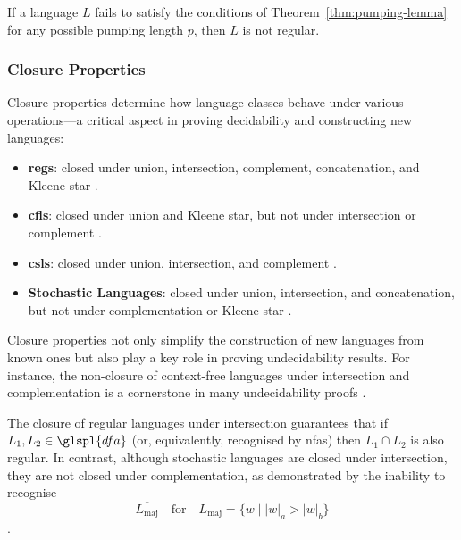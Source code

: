 \begin{corollary}
If a language $L$ fails to satisfy the conditions of Theorem~\ref{thm:pumping-lemma} for any possible pumping length $p$, then $L$ is not regular.
\end{corollary}

\subsubsection{Closure Properties}
Closure properties determine how language classes behave under various operations—a critical aspect in proving decidability and constructing new languages:

\begin{itemize}
    \item \textbf{\glspl{reg}}: closed under union, intersection, complement, concatenation, and Kleene star \cite{sipser2013introduction}.
    \item \textbf{\glspl{cfl}}: closed under union and Kleene star, but not under intersection or complement \cite{chomsky1956three, sipser2013introduction}.
    \item \textbf{\glspl{csl}}: closed under union, intersection, and complement \cite{chomsky1956three, sipser2013introduction}.
    \item \textbf{Stochastic Languages}: closed under union, intersection, and concatenation, but not under complementation or Kleene star \cite{rabin1963probabilistic, droste2009handbook}.
\end{itemize}

\begin{observation}
Closure properties not only simplify the construction of new languages from known ones but also play a key role in proving undecidability results. For instance, the non-closure of context-free languages under intersection and complementation is a cornerstone in many undecidability proofs \cite{sipser2013introduction}.
\end{observation}

\begin{example}
The closure of regular languages under intersection guarantees that if $L_1, L_2 \in \glspl{dfa}$ (or, equivalently, recognised by \glspl{nfa}) then $L_1 \cap L_2$ is also regular. In contrast, although stochastic languages are closed under intersection, they are not closed under complementation, as demonstrated by the inability to recognise 
\[
\overline{L_{\text{maj}}} \quad \text{for} \quad L_{\text{maj}} = \{w \mid |w|_a > |w|_b\}
\]
\cite{rabin1963probabilistic}.
\end{example}

